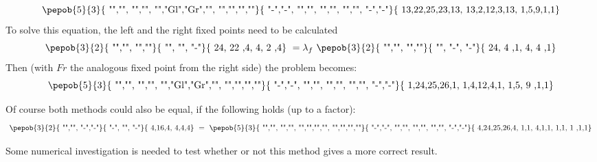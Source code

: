 \begin{equation}
    \vcenter{ \hbox{   \pepob{5}{3}{{
                        "","", "","",
                        "","Gl","Gr","",
                        "","","",""}}{{
                        "-","-",
                        "","",
                        "","",
                        "","",
                        "-","-"}}{{
                        13,22,25,23,13,
                        13,2,12,3,13,
                        1,5,9,1,1}} }}
\end{equation}
To solve this equation, the left and the right fixed points need to be calculated
\begin{equation}\label{eq:vumps_B_own}
    \vcenter{ \hbox{   \pepob{3}{2}{{
                        "","",
                        "",""}}{{
                        "",
                        "",
                        "-"}}{{
                        24, 22 ,4,
                        4,  2 ,4}} }} = \lambda_f    \vcenter{ \hbox{  \pepob{3}{2}{{
                        "","",
                        "",""}}{{
                        "",
                        "-",
                        "-"}}{{
                        24, 4 ,1,
                        4,  4 ,1}} }}
\end{equation}
Then (with $Fr$ the analogous fixed point from the right side) the problem becomes:
\begin{equation}
    \vcenter{ \hbox{   \pepob{5}{3}{{
                        "","", "","",
                        "","Gl","Gr","",
                        "","","",""}}{{
                        "-","-",
                        "","",
                        "","",
                        "","",
                        "-","-"}}{{
                        1,24,25,26,1,
                        1,4,12,4,1,
                        1,5, 9  ,1,1}} }}
\end{equation}

Of course both methods could also be equal, if the following holds (up to a factor):
\begin{equation}
    \vcenter{ \hbox{  \pepob{3}{2}{{
                        "","",
                        "-","-"}}{{
                        "-",
                        "",
                        "-"}}{{
                        4,16,4,
                        4,4,4}} }} =   \vcenter{ \hbox{   \pepob{5}{3}{{
                        "","", "","",
                        "","","","",
                        "","","",""}}{{
                        "-","-",
                        "","",
                        "","",
                        "","",
                        "-","-"}}{{
                        4,24,25,26,4,
                        1,1, 4,1,1,
                        1,1, 1  ,1,1}} }}
\end{equation}

Some numerical investigation is needed to test whether or not this method gives a more correct result.

